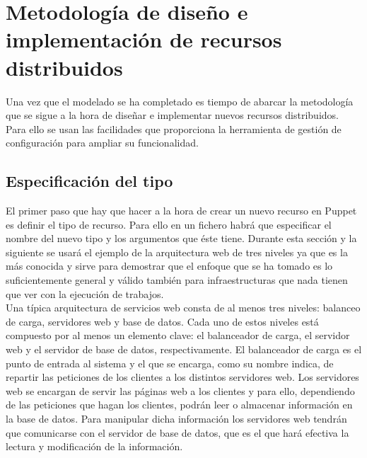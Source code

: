 \chapter{Metodología de diseño e implementación de recursos distribuidos}
\label{cap:metodologia}


Una vez que el modelado se ha completado es tiempo de abarcar la metodología que se sigue a la hora de diseñar e implementar nuevos recursos distribuidos. Para ello se usan las facilidades que proporciona la herramienta de gestión de configuración para ampliar su funcionalidad.


\section{Especificación del tipo}

El primer paso que hay que hacer a la hora de crear un nuevo recurso en Puppet es definir el tipo de recurso. Para ello en un fichero habrá que especificar el nombre del nuevo tipo y los argumentos que éste tiene. Durante esta sección y la siguiente se usará el ejemplo de la arquitectura web de tres niveles ya que es la más conocida y sirve para demostrar que el enfoque que se ha tomado es lo suficientemente general y válido también para infraestructuras que nada tienen que ver con la ejecución de trabajos. \\

Una típica arquitectura de servicios web consta de al menos tres niveles: balanceo de carga, servidores web y base de datos. Cada uno de estos niveles está compuesto por al menos un elemento clave: el balanceador de carga, el servidor web y el servidor de base de datos, respectivamente. El balanceador de carga es el punto de entrada al sistema y el que se encarga, como su nombre indica, de repartir las peticiones de los clientes a los distintos servidores web. Los servidores web se encargan de servir las páginas web a los clientes y para ello, dependiendo de las peticiones que hagan los clientes, podrán leer o almacenar información en la base de datos. Para manipular dicha información los servidores web tendrán que comunicarse con el servidor de base de datos, que es el que hará efectiva la lectura y modificación de la información.\\

